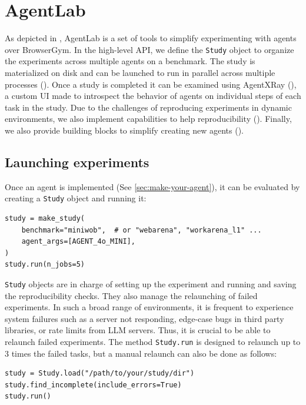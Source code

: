 \documentclass[10pt]{article} %
\newcommand{\code}[1]{\texttt{#1}}
\begin{document}
\section{AgentLab}
\label{sec:agentlab}


As depicted in , AgentLab is a set of tools to simplify experimenting with 
agents over BrowserGym. In the high-level API, we define the \code{Study} object to organize the experiments across multiple agents on a benchmark. The study is materialized on disk and can be launched to run in parallel across multiple processes (). Once a study is completed it can be examined using AgentXRay (), a custom UI made to introspect the behavior of agents on individual steps of each task in the study. Due to the challenges of reproducing experiments in dynamic environments, we also implement capabilities to help reproducibility (). Finally, we also provide building blocks to simplify creating new agents ().

\subsection{Launching experiments}\label{sec:launch-experiments}
Once an agent is implemented (See \cref{sec:make-your-agent}), it can be evaluated by creating a \code{Study} object and running it: 
\vspace{-0.5em}
\begin{verbatim}
study = make_study(
    benchmark="miniwob",  # or "webarena", "workarena_l1" ...
    agent_args=[AGENT_4o_MINI],
)
study.run(n_jobs=5)
\end{verbatim}
\code{Study} objects are in charge of setting up the experiment and running and saving the reproducibility checks. They also manage the relaunching of failed experiments. In such a broad range of environments, it is frequent to experience system failures such as a server not responding,  edge-case bugs in third party libraries, or rate limits from LLM servers. Thus, it is crucial to be able to relaunch failed experiments. 
The method \code{Study.run} is designed to relaunch up to 3 times the failed tasks, but a manual relaunch can also be done as follows:
\vspace{-0.5em}
\begin{verbatim}
study = Study.load("/path/to/your/study/dir")
study.find_incomplete(include_errors=True)
study.run()
\end{verbatim}
\end{document}
